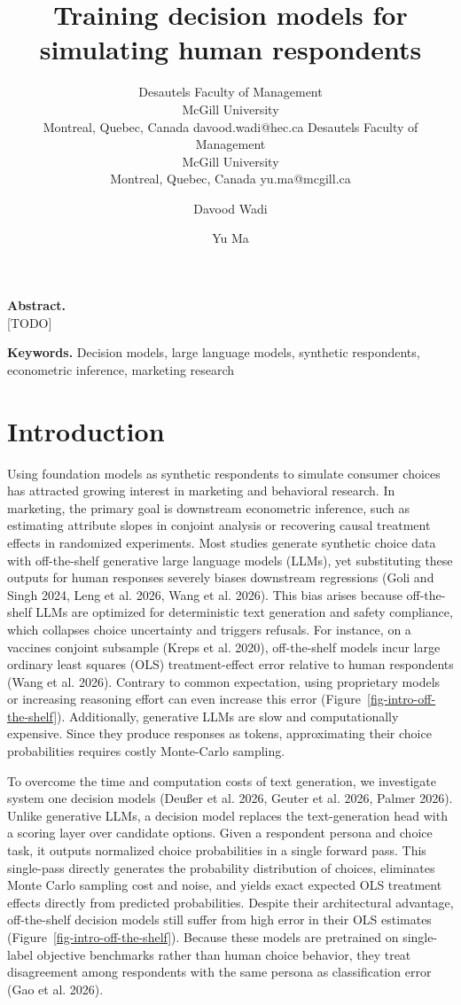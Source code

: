 \documentclass[
  11pt,
  letterpaper,
]{article}
\author{%
    \aclauthor{Davood Wadi}
      {Desautels Faculty of Management\\ McGill University\\ Montreal, Quebec, Canada}
      {davood.wadi@hec.ca}%
    \hspace{3em}%
    \aclauthor{Yu Ma}
      {Desautels Faculty of Management\\ McGill University\\ Montreal, Quebec, Canada}
      {yu.ma@mcgill.ca}%
  }%
\title{Training decision models for simulating human respondents}
\author{Davood Wadi \and Yu Ma}
\date{}
\begin{document}
\maketitle


\textbf{Abstract.}\\
{[}TODO{]}

\textbf{Keywords.} Decision models, large language models, synthetic
respondents, econometric inference, marketing research

\section{Introduction}\label{sec-intro}

Using foundation models as synthetic respondents to simulate consumer
choices has attracted growing interest in marketing and behavioral
research. In marketing, the primary goal is downstream econometric
inference, such as estimating attribute slopes in conjoint analysis or
recovering causal treatment effects in randomized experiments. Most
studies generate synthetic choice data with off-the-shelf generative
large language models (LLMs), yet substituting these outputs for human
responses severely biases downstream regressions (Goli and Singh 2024,
Leng et al. 2026, Wang et al. 2026). This bias arises because
off-the-shelf LLMs are optimized for deterministic text generation and
safety compliance, which collapses choice uncertainty and triggers
refusals. For instance, on a vaccines conjoint subsample (Kreps et al.
2020), off-the-shelf models incur large ordinary least squares (OLS)
treatment-effect error relative to human respondents (Wang et al. 2026).
Contrary to common expectation, using proprietary models or increasing
reasoning effort can even increase this error
(Figure~\ref{fig-intro-off-the-shelf}). Additionally, generative LLMs
are slow and computationally expensive. Since they produce responses as
tokens, approximating their choice probabilities requires costly
Monte-Carlo sampling.

To overcome the time and computation costs of text generation, we
investigate system one decision models (Deußer et al. 2026, Geuter et
al. 2026, Palmer 2026). Unlike generative LLMs, a decision model
replaces the text-generation head with a scoring layer over candidate
options. Given a respondent persona and choice task, it outputs
normalized choice probabilities in a single forward pass. This
single-pass directly generates the probability distribution of choices,
eliminates Monte Carlo sampling cost and noise, and yields exact
expected OLS treatment effects directly from predicted probabilities.
Despite their architectural advantage, off-the-shelf decision models
still suffer from high error in their OLS estimates
(Figure~\ref{fig-intro-off-the-shelf}). Because these models are
pretrained on single-label objective benchmarks rather than human choice
behavior, they treat disagreement among respondents with the same
persona as classification error (Gao et al. 2026).
\end{document}
